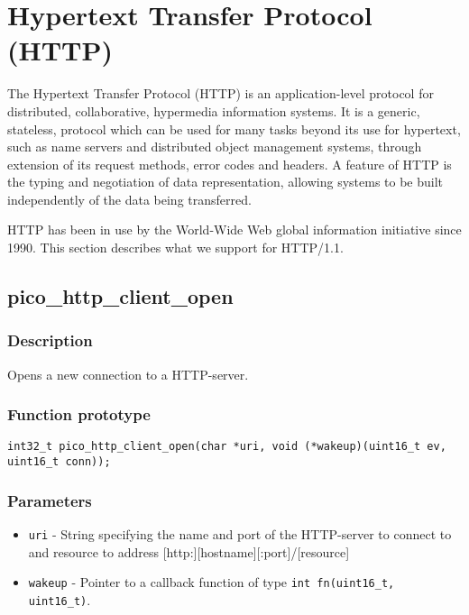\section{Hypertext Transfer Protocol (HTTP)}
The Hypertext Transfer Protocol (HTTP) is an application-level protocol for distributed, collaborative, hypermedia information systems. It is a generic, stateless, protocol which can be used for many tasks beyond its use for hypertext, such as name servers and distributed object management systems, through extension of its request methods, error codes and headers. A feature of HTTP is the typing and negotiation of data representation, allowing systems to be built independently of the data being transferred.

HTTP has been in use by the World-Wide Web global information initiative since 1990. This section describes what we support for HTTP/1.1.

\subsection{pico\_http\_client\_open}

\subsubsection*{Description}
Opens a new connection to a HTTP-server.

\subsubsection*{Function prototype}
\texttt{int32\_t pico\_http\_client\_open(char *uri,
                void (*wakeup)(uint16\_t ev, uint16\_t conn));}

\subsubsection*{Parameters}
\begin{itemize}[noitemsep]
\item \texttt{uri} - String specifying the name and port of the HTTP-server to connect to and resource to address [http:][hostname][:port]/[resource]
\item \texttt{wakeup} - Pointer to a callback function of type \texttt{int fn(uint16\_t, uint16\_t)}.
\end{itemize}

